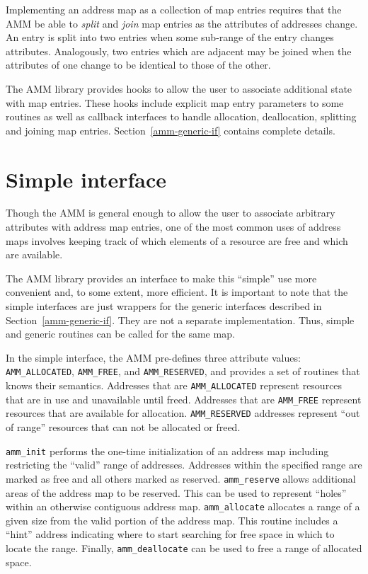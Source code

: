 Implementing an address map as a collection of map entries requires
that the AMM be able to \emph{split} and \emph{join} map entries
as the attributes of addresses change.
An entry is split into two entries when some sub-range of the entry changes
attributes.
Analogously, two entries which are adjacent may be joined when
the attributes of one change to be identical to those of the other.

The AMM library provides hooks to allow the user to associate additional
state with map entries.
These hooks include explicit map entry parameters to some routines as
well as callback interfaces to handle allocation, deallocation, splitting
and joining map entries.
Section~\ref{amm-generic-if} contains complete details.

\section{Simple interface}
\label{amm-simple-if}

Though the AMM is general enough to allow the user to associate arbitrary
attributes with address map entries, one of the most common uses of address maps
involves keeping track of which elements of a resource are free and which
are available.

The AMM library provides an interface to make this ``simple'' use more
convenient and, to some extent, more efficient.
It is important to note that the simple interfaces are just wrappers for
the generic interfaces described in Section~\ref{amm-generic-if}.
They are not a separate implementation.
Thus, simple and generic routines can be called for the same map.

In the simple interface, the AMM pre-defines three attribute values:
{\tt AMM_ALLOCATED}, {\tt AMM_FREE}, and {\tt AMM_RESERVED},
and provides a set of routines that knows their semantics.
Addresses that are {\tt AMM_ALLOCATED} represent resources that are in use
and unavailable until freed.
Addresses that are {\tt AMM_FREE} represent resources that are available
for allocation.
{\tt AMM_RESERVED} addresses represent ``out of range'' resources that can
not be allocated or freed.

{\tt amm_init} performs the one-time initialization of an address map
including restricting the ``valid'' range of addresses.
Addresses within the specified range are marked as free and all others
marked as reserved.
{\tt amm_reserve} allows additional areas of the address map to be reserved.
This can be used to represent ``holes'' within an otherwise contiguous
address map.
{\tt amm_allocate} allocates a range of a given size from the valid portion
of the address map.
This routine includes a ``hint'' address indicating where to start searching
for free space in which to locate the range.
Finally, {\tt amm_deallocate} can be used to free a range of allocated space.

